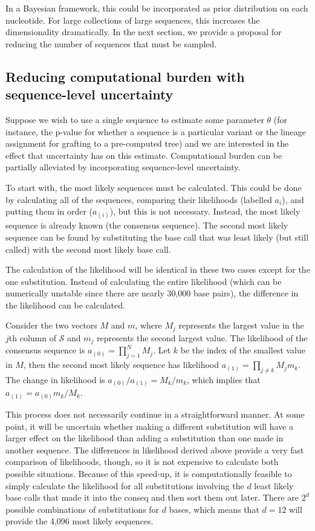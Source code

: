 \documentclass[
]{article}
\newcommand{\nps}{\mathcal{S}} %
\begin{document}
In a Bayesian framework, this could be incorporated as prior
distribution on each nucleotide. For large collections of large
sequences, this increases the dimensionality dramatically. In the next
section, we provide a proposal for reducing the number of sequences that
must be sampled.

\hypertarget{reducing-computational-burden-with-sequence-level-uncertainty}{%
\subsection{Reducing computational burden with sequence-level
uncertainty}\label{reducing-computational-burden-with-sequence-level-uncertainty}}

Suppose we wish to use a single sequence to estimate some parameter
\(\theta\) (for instance, the p-value for whether a sequence is a
particular variant or the lineage assignment for grafting to a
pre-computed tree) and we are interested in the effect that uncertainty
has on this estimate. Computational burden can be partially alleviated
by incorporating sequence-level uncertainty.

To start with, the most likely sequences must be calculated. This could
be done by calculating all of the sequences, comparing their likelihoods
(labelled \(a_i\)), and putting them in order (\(a_{(i)}\)), but this is
not necessary. Instead, the most likely sequence is already known (the
consensus sequence). The second most likely sequence can be found by
substituting the base call that was least likely (but still called) with
the second most likely base call.

The calculation of the likelihood will be identical in these two cases
except for the one substitution. Instead of calculating the entire
likelihood (which can be numerically unstable since there are nearly
30,000 base pairs), the difference in the likelihood can be calculated.

Consider the two vectors \(M\) and \(m\), where \(M_j\) represents the
largest value in the \(j\)th column of \(\nps\) and \(m_j\) represents
the second largest value. The likelihood of the consensus sequence is
\(a_{(0)} = \prod_{j=1}^NM_j\). Let \(k\) be the index of the smallest
value in \(M\), then the second most likely sequence has likelihood
\(a_{(1)} = \prod_{j\ne k}M_jm_k\). The change in likelihood is
\(a_{(0)}/a_{(1)} = M_k/m_k\), which implies that
\(a_{(1)} = a_{(0)}m_k/M_k\).

This process does not necessarily continue in a straightforward manner.
At some point, it will be uncertain whether making a different
substitution will have a larger effect on the likelihood than adding a
substitution than one made in another sequence. The differences in
likelihood derived above provide a very fast comparison of likelihoods,
though, so it is not expensive to calculate both possible situations.
Because of this speed-up, it is computationally feasible to simply
calculate the likelihood for all substitutions involving the \(d\) least
likely base calls that made it into the conseq and then sort them out
later. There are \(2^d\) possible combinations of substitutions for
\(d\) bases, which means that \(d=12\) will provide the 4,096 most
likely sequences.
\end{document}

